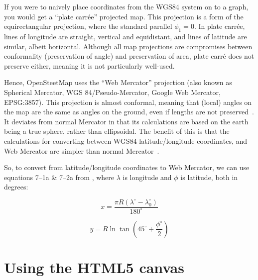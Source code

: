 \documentclass[]{final_report}
\begin{document}
If you were to naively place coordinates from the WGS84 system on to a graph, you would get a ``plate carrée'' projected map. This projection is a form of the equirectangular projection, where the standard parallel \(\phi_1 = 0\). In plate carrée, lines of longitude are straight, vertical and equidistant, and lines of latitude are similar, albeit horizontal. Although all map projections are compromises between conformality (preservation of angle) and preservation of area, plate carré does not preserve either, meaning it is not particularly well-used.

Hence, OpenSteetMap uses the ``Web Mercator'' projection (also known as Spherical Mercator, WGS 84/Pseudo-Mercator, Google Web Mercator, EPSG:3857). This projection is almost conformal, meaning that (local) angles on the map are the same as angles on the ground, even if lengths are not preserved~\cite{carto-implications-of-webmercator,}. It deviates from normal Mercator in that its calculations are based on the earth being a true sphere, rather than ellipsoidal. The benefit of this is that the calculations for converting between WGS84 latitude/longitude coordinates, and Web Mercator are simpler than normal Mercator~\cite{ugrc-earth-not-round}.

So, to convert from latitude/longitude coordinates to Web Mercator, we can use equations 7--1a \& 7--2a from \textcite[41]{snyder1987map}, where \(\lambda{}\) is longitude and \(\phi{}\) is latitude, both in degrees:

\[x = \frac{\pi R(\lambda^\circ - \lambda^\circ_0)}{180^\circ} \]

\[y = R \ln \tan \left( 45^\circ + \frac{\phi^\circ}{2} \right) \]

\chapter{Using the HTML5 canvas}

\printbibliography{}
\end{document}

